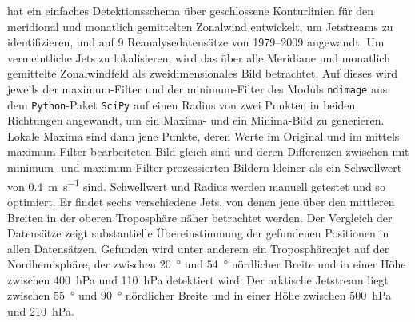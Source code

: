 \citet{rikus-2015} hat ein einfaches Detektionsschema über geschlossene Konturlinien für den meridional und monatlich gemittelten Zonalwind entwickelt, um Jetstreams zu identifizieren, und auf \num{9} Reanalysedatensätze von \numrange{1979}{2009} angewandt. Um vermeintliche Jets zu lokalisieren, wird das über alle Meridiane und monatlich gemittelte Zonalwindfeld als zweidimensionales Bild betrachtet. Auf dieses wird jeweils der maximum-Filter und der minimum-Filter des Moduls \texttt{ndimage} aus dem \texttt{Python}-Paket \texttt{SciPy} auf einen Radius von zwei Punkten in beiden Richtungen angewandt, um ein Maxima- und ein Minima-Bild zu generieren. Lokale Maxima sind dann jene Punkte, deren Werte im Original und im mittels maximum-Filter bearbeiteten Bild gleich sind und deren Differenzen zwischen mit minimum- und maximum-Filter prozessierten Bildern kleiner als ein Schwellwert von \SI{0.4}{\metre\per\second} sind. Schwellwert und Radius werden manuell getestet und so optimiert. Er findet sechs verschiedene Jets, von denen jene über den mittleren Breiten in der oberen Troposphäre näher betrachtet werden. Der Vergleich der Datensätze zeigt substantielle Übereinstimmung der gefundenen Positionen in allen Datensätzen. Gefunden wird unter anderem ein Troposphärenjet auf der Nordhemisphäre, der zwischen \SI{20}{\degree} und \SI{54}{\degree} nördlicher Breite und in einer Höhe zwischen \SI{400}{\hecto\pascal} und \SI{110}{\hecto\pascal} detektiert wird. Der arktische Jetstream liegt zwischen \SI{55}{\degree} und \SI{90}{\degree} nördlicher Breite und in einer Höhe zwischen \SI{500}{\hecto\pascal} und \SI{210}{\hecto\pascal}.

